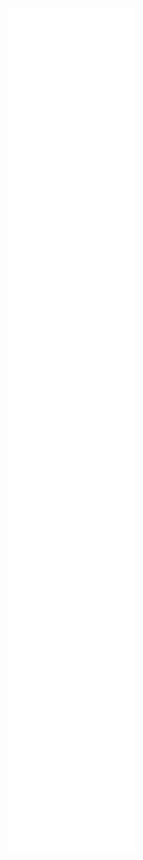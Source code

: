 \documentclass[10pt]{article}
\begin{document}
\includegraphics[max width=\textwidth, center]{2025_04_17_46e04c6acd873ea9558dg-142(6)}\\
\end{document}
